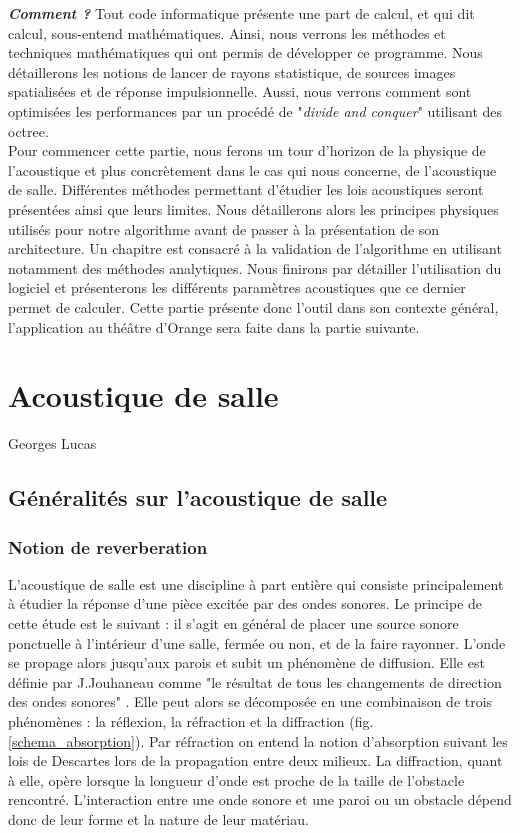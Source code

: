 \textit{\textbf{Comment ?}} Tout code informatique présente une part de calcul, et qui dit calcul, sous-entend mathématiques. Ainsi, nous verrons les méthodes et techniques mathématiques qui ont permis de développer ce programme. Nous détaillerons les notions de lancer de rayons statistique, de sources images spatialisées et de réponse impulsionnelle. Aussi, nous verrons comment sont optimisées les performances par un procédé de "\textit{divide and conquer}" utilisant des \gls{octree}. \\

Pour commencer cette partie, nous ferons un tour d'horizon de la physique de l'acoustique et plus concrètement dans le cas qui nous concerne, de l'acoustique de salle. Différentes méthodes permettant d'étudier les lois acoustiques seront présentées ainsi que leurs limites. Nous détaillerons alors les principes physiques utilisés pour notre algorithme avant de passer à la présentation de son architecture. Un chapitre est consacré à la validation de l'algorithme en utilisant notamment des méthodes analytiques. Nous finirons par détailler l'utilisation du logiciel et présenterons les différents paramètres acoustiques que ce dernier permet de calculer. Cette partie présente donc l'outil dans son contexte général, l'application au théâtre d'Orange sera faite dans la partie suivante.



\chapter{Acoustique de salle}
			{Georges Lucas}
		\minitoc
		\newpage
			
		
\section{Généralités sur l'acoustique de salle}
\subsection{Notion de reverberation}
L'acoustique de salle est une discipline à part entière qui consiste principalement à étudier la réponse d'une pièce excitée par des ondes sonores. Le principe de cette étude est le suivant : il s'agit en général de placer une source sonore ponctuelle à l'intérieur d'une salle, fermée ou non, et de la faire rayonner. L'onde se propage alors jusqu'aux parois et subit un phénomène de diffusion. Elle est définie par J.Jouhaneau comme "le résultat de tous les changements de direction des ondes sonores" \cite[p. 3]{jouhaneau}. Elle peut alors se décomposée en une combinaison de trois phénomènes : la réflexion, la réfraction et la diffraction (fig. \ref{schema_absorption}). Par réfraction on entend la notion d'absorption suivant les lois de Descartes lors de  la propagation entre deux milieux. La diffraction, quant à elle, opère lorsque la longueur d'onde est proche de la taille de l'obstacle rencontré. L'interaction entre une onde sonore et une paroi ou un obstacle dépend donc de leur forme et la nature de leur matériau.

